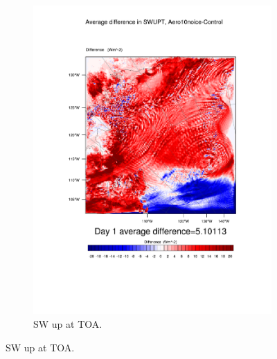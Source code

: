 \begin{figure}
\begin{subfigure}{0.48\textwidth}
		\includegraphics[width=\textwidth]{results/aero10ni/diff_Aero10NoIce_SWUPT_Day1.pdf}
		\caption{SW up at TOA.}
		\label{subfig:swup_r4Day1}
	\end{subfigure}
	

\end{figure}

